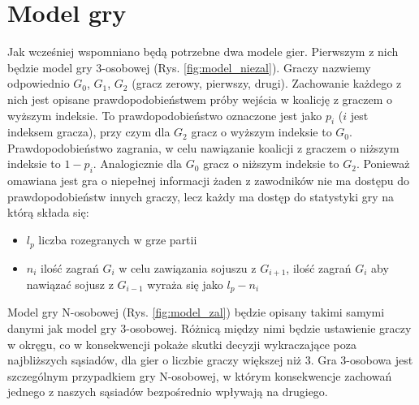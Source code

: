\section{Model gry}
\label{sec:model}
Jak wcześniej wspomniano będą potrzebne dwa modele gier. Pierwszym z nich będzie model gry 3-osobowej (Rys. \ref{fig:model_niezal}). Graczy nazwiemy odpowiednio $G_0$, $G_1$, $G_2$ (gracz zerowy, pierwszy, drugi). Zachowanie każdego z nich jest opisane prawdopodobieństwem próby wejścia w koalicję z graczem o wyższym indeksie. To prawdopodobieństwo oznaczone jest jako $p_i$ ($i$ jest indeksem gracza), przy czym dla $G_2$ gracz o wyższym indeksie to $G_0$. Prawdopodobieństwo zagrania, w celu nawiązanie koalicji z graczem o niższym indeksie to $1 - p_i$. Analogicznie dla $G_0$ gracz o niższym indeksie to $G_2$. Ponieważ omawiana jest gra o niepełnej informacji żaden z zawodników nie ma dostępu do prawdopodobieństw innych graczy, lecz każdy ma dostęp do statystyki gry na którą składa się:
\begin{itemize}
\item $l_p$ liczba rozegranych w grze partii
\item $n_i$ ilość zagrań $G_i$ w celu zawiązania sojuszu z $G_{i+1}$, ilość zagrań $G_{i}$ aby nawiązać sojusz z $G_{i-1}$ wyraża się jako $l_p - n_i$
\end{itemize}
Model gry N-osobowej (Rys. \ref{fig:model_zal}) \cite{Fsmd} będzie opisany takimi samymi danymi jak model gry 3-osobowej. Różnicą między nimi będzie ustawienie graczy w okręgu, co w konsekwencji pokaże skutki decyzji wykraczające poza najbliższych sąsiadów, dla gier o liczbie graczy większej niż 3. Gra 3-osobowa jest szczególnym przypadkiem gry N-osobowej, w którym konsekwencje zachowań jednego z naszych sąsiadów bezpośrednio wpływają na drugiego.

